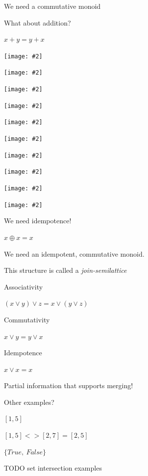 \documentclass[usenames,dvipsnames,svgnames,table,aspectratio=1610,mathserif]{beamer}
\newcommand{\nl}{\vspace{\baselineskip}}
\newcommand{\textslide}[1]{{
\begin{frame}
\begin{center}

#1

\end{center}
\end{frame}
}}
\newcommand{\imageslide}[2][1]{{
\begin{frame}\begin{center}
\texttt{[image: \#2]}
\end{center}\end{frame}
}}
\newcommand{\imageslideleft}[2][1]{{
\begin{frame}
\texttt{[image: \#2]}
\end{frame}
}}
\begin{document}
\textslide{\Large{
We need a commutative monoid

What about addition?

\nl

$x + y = y + x$
}}

\imageslide[0.6]{diagrams/doubleplus15.pdf}
\imageslide[0.6]{diagrams/doubleplus16.pdf}
\imageslide[0.6]{diagrams/doubleplus17.pdf}

\imageslideleft{diagrams/badd5.pdf}
\imageslideleft{diagrams/badd6.pdf}
\imageslideleft{diagrams/badd7.pdf}
\imageslideleft{diagrams/badd8.pdf}
\imageslideleft{diagrams/badd9.pdf}
\imageslideleft{diagrams/badd10.pdf}
\imageslideleft{diagrams/badd11.pdf}


\textslide{\Large{
We need idempotence!

\nl

$x \oplus x = x$

}}

\textslide{\Large{

We need an idempotent, commutative monoid.

This structure is called a {\it join-semilattice}

\nl

Associativity

$(x \vee y) \vee z = x \vee (y \vee z)$
\nl

Commutativity

$x \vee y = y \vee x$
\nl

Idempotence

$x \vee x = x$

}}


\textslide{
{\LARGE Partial information that supports merging!}
}



\textslide{\LARGE Other examples?}

\begin{frame}
\begin{center}
\Huge $[1,5]$
\end{center}
\end{frame}


\begin{frame}
\begin{center}
\Huge $[1, 5] <> [2, 7] = [2,5]$
\end{center}
\end{frame}


\begin{frame}
\begin{center}
\Huge $\{True,\ False\}$
\end{center}
\end{frame}


\begin{frame}
TODO set intersection examples
\end{frame}
\end{document}
